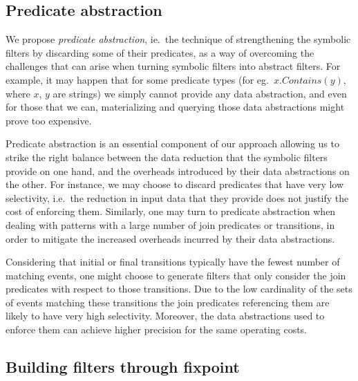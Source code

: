 \subsection{Predicate abstraction}
\label{sec:pred_abstraction}


We propose {\em predicate abstraction}, ie.\ the technique of strengthening
 the
symbolic filters by discarding some of their predicates, as a way of
 overcoming
the challenges that can arise when turning symbolic filters into abstract 
filters.
For example, it may happen that for some predicate types
(for eg.\ $x.Contains(y)$, where $x$, $y$ are strings) we simply cannot
 provide
any data abstraction, and even for those that we can, materializing and
 querying
those data abstractions might prove too expensive.

Predicate abstraction is an essential component of our approach
allowing us to strike the right balance between the data reduction that the
symbolic filters provide on one hand, and the overheads introduced by their
data abstractions on the other.
For instance, we may choose to discard
predicates that have very low selectivity, i.e.\ the reduction in input 
data
that they provide does not justify the cost of enforcing them.
Similarly, one may turn to predicate abstraction when dealing with patterns
 with
a large number of join predicates or transitions, in order to mitigate the
increased overheads incurred by their data abstractions.

Considering that initial or final transitions typically have the fewest
number of matching events, one might choose to generate filters that only
consider the join predicates with respect to those transitions.
Due to the low cardinality of the sets of events matching these transitions 
the join predicates referencing them are likely to have very high 
selectivity.
Moreover, the data abstractions used to enforce them can achieve higher
precision for the same operating costs.




\subsection{Building filters through fixpoint}


